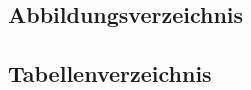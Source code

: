 \documentclass[main.tex]{subfiles} %
\begin{document}

\subsection{Abbildungsverzeichnis}
\listoffigures

\subsection{Tabellenverzeichnis}
\listoftables
\end{document}
